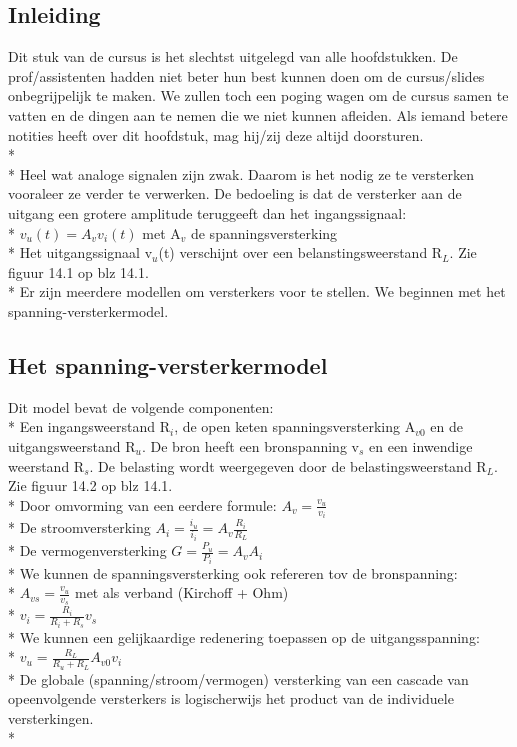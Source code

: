 \documentclass[10pt]{article}
\begin{document}
\subsection{Inleiding}
Dit stuk van de cursus is het slechtst uitgelegd van alle hoofdstukken. De prof/assistenten hadden niet beter hun best kunnen doen om de cursus/slides onbegrijpelijk te maken. We zullen toch een poging wagen om de cursus samen te vatten en de dingen aan te nemen die we niet kunnen afleiden. Als iemand betere notities heeft over dit hoofdstuk, mag hij/zij deze altijd doorsturen.\\*\\*
Heel wat analoge signalen zijn zwak. Daarom is het nodig ze te versterken vooraleer ze verder te verwerken. De bedoeling is dat de versterker aan de uitgang een grotere amplitude teruggeeft dan het ingangssignaal:\\*
$v_u(t) = A_vv_i(t)$ met A$_v$ de spanningsversterking\\*
Het uitgangssignaal v$_u$(t) verschijnt over een belanstingsweerstand R$_L$. Zie figuur 14.1 op blz 14.1.\\*
Er zijn meerdere modellen om versterkers voor te stellen. We beginnen met het spanning-versterkermodel.
\subsection{Het spanning-versterkermodel}
Dit model bevat de volgende componenten:\\*
Een ingangsweerstand R$_i$, de open keten spanningsversterking A$_{v0}$ en de uitgangsweerstand R$_u$. De bron heeft een bronspanning v$_s$ en een inwendige weerstand R$_s$. De belasting wordt weergegeven door de belastingsweerstand R$_L$. Zie figuur 14.2 op blz 14.1.\\*
Door omvorming van een eerdere formule: $A_v = \frac{v_u}{v_i}$\\*
De stroomversterking $A_i = \frac{i_u}{i_i} = A_v\frac{R_i}{R_L}$\\*
De vermogenversterking $G = \frac{P_u}{P_i} = A_vA_i$\\*
We kunnen de spanningsversterking ook refereren tov de bronspanning:\\*
$A_{vs} = \frac{v_u}{v_s}$ met als verband (Kirchoff + Ohm)\\*
$v_i = \frac{R_i}{R_i+R_s}v_s$\\*
We kunnen een gelijkaardige redenering toepassen op de uitgangsspanning:\\*
$v_u = \frac{R_L}{R_u+R_L}A_{v0}v_i$\\*
De globale (spanning/stroom/vermogen) versterking van een cascade van opeenvolgende versterkers is logischerwijs het product van de individuele versterkingen.\\*
\end{document}
